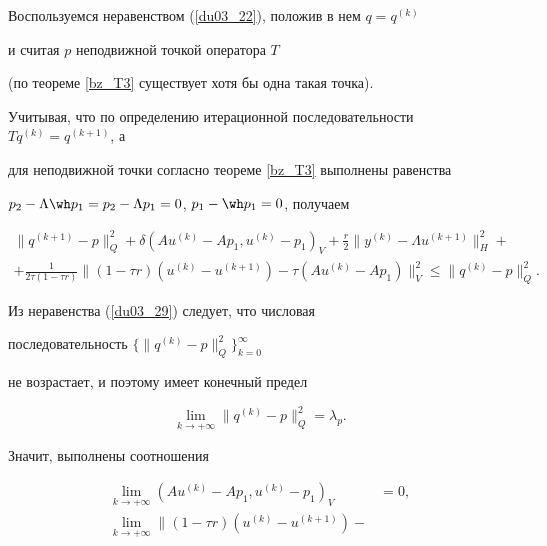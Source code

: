 \begin{pf}


Воспользуемся неравенством (\ref{du03_22}), положив в нем $q=q^{(k)}$


и считая $p$ неподвижной точкой оператора $T$ 


(по теореме \ref{bz_T3} существует хотя бы одна такая точка).


Учитывая, что по определению итерационной последовательности $Tq^{(k)}=q^{(k+1)}$, а


для неподвижной точки согласно теореме \ref{bz_T3} выполнены равенства


$ p_2-\Lambda \wh p_1=p_2-\Lambda p_1=0 $, $ p_1-\wh p_1=0 $, получаем


\begin{multline}


 \| {q^{(k+1)}- p} \|_Q^2+\delta (A u^{(k)}-A p_1, u^{(k)}-p_1)_V+


\frac {r} {2} \| y^{(k)}-\Lambda u^{(k+1)} \|_H^2+ \\


%


+\frac {1}{2 \tau (1-\tau r)} \| (1-\tau r) (u^{(k)} -u^{(k+1)})


- \tau (A u^{(k)}- A p_1) \|_V^2


\leq \| {q^{(k)}-p} \|_Q^2 .


\label{du03_29}


\end{multline}


Из неравенства (\ref{du03_29}) следует, что числовая


последовательность $ \{\| {q^{(k)}-p} \|_Q^2 \}_{k=0} ^{\infty}$


не возрастает, и поэтому имеет конечный предел


\begin{equation}


\lim_{k \to+\infty} \| {q^{(k)}-p} \|_Q^2=\lambda_{p} .


\label{du03_29_1}


\end{equation}


Значит, выполнены соотношения


\begin{align}


\lim_{k \to+\infty} (A u^{(k)}-A p_1, u^{(k)}-p_1)_V &=0,\label{du03_30}\\


%


\lim_{k \to+\infty} \| (1-\tau r) (u^{(k)} -u^{(k+1)}) -



\end{align}
\end{pf}
